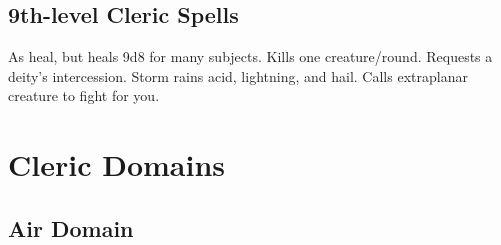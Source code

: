 \subsection{9th-level Cleric Spells}
\begin{spelllist}
 As heal, but heals 9d8 for many subjects.
 Kills one creature/round.
\M Requests a deity's intercession.
 Storm rains acid, lightning, and hail.
 Calls extraplanar creature to fight for you.
\end{spelllist}

\section{Cleric Domains}  

\begin{comment}
\subsection{Example Domain}
\parhead{Domain Power}
\parhead{Channelled Domain Power}
\parhead{Greater Domain Power}
\parhead{Greater Channelled Domain Power}
\parhead{Domain Mastery}
\begin{spelllist}
\spellhead[1]{}
\spellhead[1]{}
\spellhead[2]{}
\spellhead[2]{}
\spellhead[3]{}
\spellhead[3]{}
\spellhead[4]{}
\spellhead[4]{}
\spellhead[5]{}
\spellhead[5]{}
\spellhead[6]{}
\spellhead[6]{}
\spellhead[7]{}
\spellhead[7]{}
\spellhead[8]{}
\spellhead[8]{}
\spellhead[9]{}
\spellhead[9]{}
\end{spelllist}
\end{comment}

\subsection{Air Domain}


